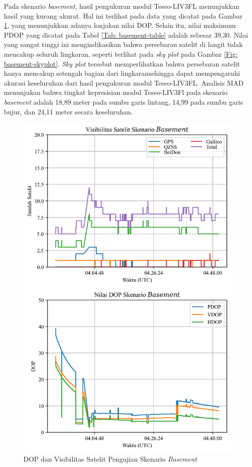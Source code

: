 Pada skenario \textit{basement}, hasil pengukuran modul Teseo-LIV3FL menunjukkan hasil yang kurang akurat. Hal ini terlihat pada data yang dicatat pada Gambar \ref{Fig: basement-sats_dop}, yang menunjukkan adanya lonjakan nilai DOP. Selain itu, nilai maksimum PDOP yang dicatat pada Tabel \ref{Tab: basement-table} adalah sebesar 39,30. Nilai yang sangat tinggi ini mengindikasikan bahwa persebaran satelit di langit tidak mencakup seluruh lingkaran, seperti terlihat pada \textit{sky plot} pada Gambar \ref{Fig: basement-skyplot}. \textit{Sky plot} tersebut memperlihatkan bahwa persebaran satelit hanya mencakup setengah bagian dari lingkaransehingga dapat mempengaruhi akurasi keseluruhan dari hasil pengukuran modul Teseo-LIV3FL. Analisis MAD menunjukan bahwa tingkat kepresisian modul Teseo-LIV3Fl pada skenario \textit{basement} adalah 18,89 meter pada sumbu garis lintang, 14,99 pada sumbu garis bujur, dan 24,11 meter secara keseluruhan.

\begin{figure}[H]
	\centering
	\includegraphics[width=12cm]{contents/chapter-4/1-skenario-basement/sats_dop.png}
	\caption{DOP dan Visibilitas Satelit Pengujian Skenario \textit{Basement}}
	\label{Fig: basement-sats_dop}
\end{figure}

